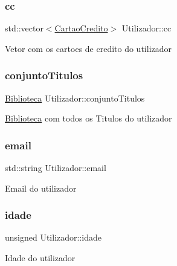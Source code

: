 \subsubsection{\texorpdfstring{cc}{cc}}
{\footnotesize\ttfamily std\+::vector$<$\mbox{\hyperlink{class_cartao_credito}{Cartao\+Credito}}$>$ Utilizador\+::cc\hspace{0.3cm}{\ttfamily [private]}}

Vetor com os cartoes de credito do utilizador \mbox{\label{class_utilizador_a82e5a6ecf4dc5c5fa4397f6f3caa0484}} 
\subsubsection{\texorpdfstring{conjunto\+Titulos}{conjuntoTitulos}}
{\footnotesize\ttfamily \mbox{\hyperlink{class_biblioteca}{Biblioteca}} Utilizador\+::conjunto\+Titulos\hspace{0.3cm}{\ttfamily [private]}}

\mbox{\hyperlink{class_biblioteca}{Biblioteca}} com todos os Titulos do utilizador \mbox{\label{class_utilizador_a3663b1ff4632d292c0b3476a960c06a7}} 
\subsubsection{\texorpdfstring{email}{email}}
{\footnotesize\ttfamily std\+::string Utilizador\+::email\hspace{0.3cm}{\ttfamily [private]}}

Email do utilizador \mbox{\label{class_utilizador_a6bbed097ba3eeeae71b777b30b478ec2}} 
\subsubsection{\texorpdfstring{idade}{idade}}
{\footnotesize\ttfamily unsigned Utilizador\+::idade\hspace{0.3cm}{\ttfamily [private]}}

Idade do utilizador \mbox{\label{class_utilizador_ab94b7e2f13eb757c2cb98104fc69ac8c}} 

